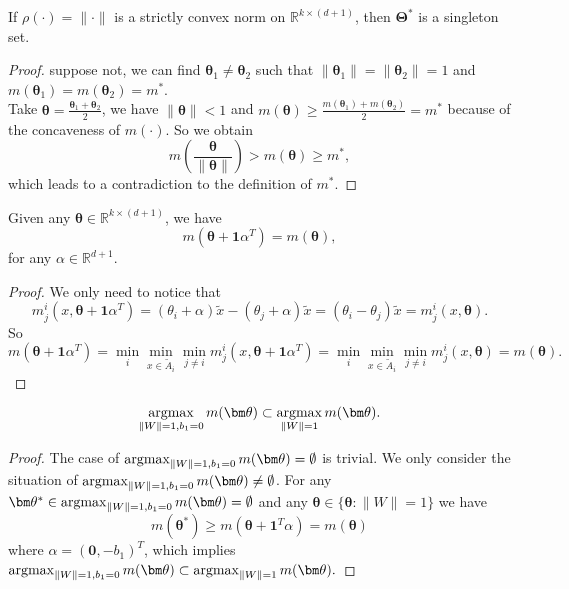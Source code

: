 \begin{lemma}
	If $\rho(\cdot) = \|\cdot\|$ is a strictly convex norm on $\mathbb{R}^{k\times (d+1)} $, then $\bm\Theta^*$ is a singleton set.
\end{lemma}


\begin{proof}
	suppose not, we can find $\bm\theta_1\neq\bm\theta_2$ such that $\|\bm\theta_1\| = \|\bm\theta_2\| = 1$ and $m(\bm\theta_1) = m(\bm\theta_2) = m^*$. \\
	\indent Take $\bm\theta = \frac{\bm\theta_1+\bm\theta_2}{2}$, we have $\|\bm\theta\| < 1$ and $m(\bm\theta) \geq \frac{m(\bm\theta_1)+m(\bm\theta_2)}{2} = m^*$ because of the concaveness of $m(\cdot)$. So we obtain
	\[
	m(\frac{\bm\theta}{\|\bm\theta\|}) > m(\bm\theta) \geq m^*,
	\]
	which leads to a contradiction to the definition of $m^*$.
\end{proof}


\begin{lemma}
	Given any $\bm\theta \in \mathbb{R}^{k\times (d+1)}$, we have 
	\[
	m(\bm\theta + \bm{1}\alpha^T) = m(\bm\theta),
	\]
	for any $\alpha \in \mathbb{R}^{d+1}$.
\end{lemma}
\begin{proof}
	We only need to notice that
	\begin{equation}
		m^i_j(x,\bm\theta + \bm{1}\alpha^T) = (\theta_i + \alpha)\tilde{x} - (\theta_j + \alpha)\tilde{x} = (\theta_i - \theta_j)\tilde{x} = m^i_j(x,\bm\theta).
	\end{equation}
	So 
	\begin{equation}
		m(\bm\theta + \bm{1}\alpha^T) = \min_{i} \min_{x\in \tilde{A}_i} \min_{j\neq i} m_j^i(x,\bm\theta + \bm{1}\alpha^T) = \min_{i} \min_{x\in \tilde{A}_i} \min_{j\neq i} m_j^i(x,\bm\theta) = m(\bm\theta).
	\end{equation}
\end{proof}

\begin{corollary}
	\begin{equation}
		\mathop{\rm argmax}_{\|W\| = 1, b_1 = 0} m(\bm\theta) \subset \mathop{\rm argmax}_{\|W\| = 1} m(\bm\theta).
	\end{equation}
\end{corollary}
\begin{proof}
	The case of $\mathop{\rm argmax}_{\|W\| = 1, b_1 = 0} m(\bm\theta) = \emptyset$ is trivial. We only consider the situation of $\mathop{\rm argmax}_{\|W\| = 1, b_1 = 0} m(\bm\theta) \neq \emptyset$. For any $\bm\theta^*\in\mathop{\rm argmax}_{\|W\| = 1, b_1 = 0} m(\bm\theta) = \emptyset$ and any $\bm\theta\in \{\bm\theta: \|W\| = 1\}$ we have 
	\begin{equation}
		m(\bm\theta^*) \geq m(\bm\theta + \bm{1}^T\alpha) = m(\bm\theta)
	\end{equation}
	where $\alpha = (\bm{0},-b_1)^T$, which implies $\mathop{\rm argmax}_{\|W\| = 1, b_1 = 0} m(\bm\theta) \subset \mathop{\rm argmax}_{\|W\| = 1} m(\bm\theta).$
\end{proof}


